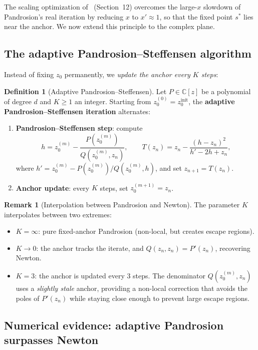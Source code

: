 \documentclass[11pt,a4paper]{article}
\theoremstyle{definition}
\newtheorem{definition}{Definition}[section]
\newtheorem{remark}{Remark}[section]
\newcommand{\CC}{\mathbb{C}}
\begin{document}
The scaling optimization of~\cite{besevic2026} (Section~12) overcomes the large-$x$ slowdown of Pandrosion's real iteration by reducing $x$ to $x' \approx 1$, so that the fixed point $s^*$ lies near the anchor.  We now extend this principle to the complex plane.

\subsection{The adaptive Pandrosion--Steffensen algorithm}

Instead of fixing $z_0$ permanently, we \emph{update the anchor every $K$ steps}:

\begin{definition}[Adaptive Pandrosion--Steffensen]
\label{def:adaptive}
Let $P \in \CC[z]$ be a polynomial of degree $d$ and $K \geq 1$ an integer.  Starting from $z_0^{(0)} = z_0^{\mathrm{init}}$, the \textbf{adaptive Pandrosion--Steffensen iteration} alternates:
\begin{enumerate}
  \item \textbf{Pandrosion--Steffensen step}: compute
  \[
    h = z_0^{(m)} - \frac{P(z_0^{(m)})}{Q(z_0^{(m)}, z_n)}, \qquad
    T(z_n) = z_n - \frac{(h - z_n)^2}{h' - 2h + z_n},
  \]
  where $h' = z_0^{(m)} - P(z_0^{(m)})/Q(z_0^{(m)}, h)$, and set $z_{n+1} = T(z_n)$.
  \item \textbf{Anchor update}: every $K$ steps, set $z_0^{(m+1)} = z_n$.
\end{enumerate}
\end{definition}

\begin{remark}[Interpolation between Pandrosion and Newton]
The parameter $K$ interpolates between two extremes:
\begin{itemize}
  \item $K = \infty$: pure fixed-anchor Pandrosion (non-local, but creates escape regions).
  \item $K \to 0$: the anchor tracks the iterate, and $Q(z_n, z_n) = P'(z_n)$, recovering Newton.
  \item $K = 3$: the anchor is updated every 3 steps.  The denominator $Q(z_0^{(m)}, z_n)$ uses a \emph{slightly stale} anchor, providing a non-local correction that avoids the poles of $P'(z_n)$ while staying close enough to prevent large escape regions.
\end{itemize}
\end{remark}

\subsection{Numerical evidence: adaptive Pandrosion surpasses Newton}
\end{document}
